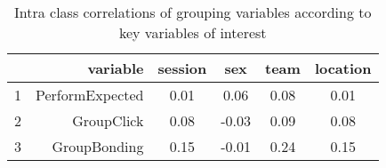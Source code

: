 \begin{table}[ht]
\centering
\begin{tabular}{rrcccc}
  \hline
 & variable & session & sex & team & location \\ 
  \hline
1 & PerformExpected & 0.01 & 0.06 & 0.08 & 0.01 \\ 
  2 & GroupClick & 0.08 & -0.03 & 0.09 & 0.08 \\ 
  3 & GroupBonding & 0.15 & -0.01 & 0.24 & 0.15 \\ 
   \hline
\end{tabular}
\caption{Intra class correlations of grouping variables according to key variables of interest} 
\label{tab:ICCTable}
\end{table}
